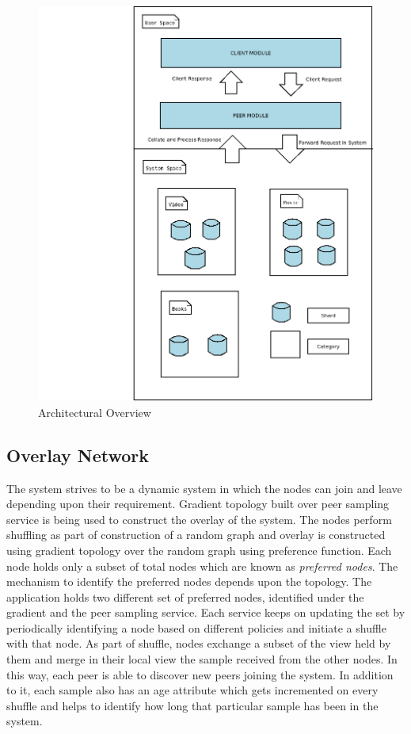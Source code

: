 \documentclass[12pt,a4paper,twoside,openright]{book}
\begin{document}
\begin{figure}[h]
	\includegraphics[scale=0.35]{OverallFunctioning}
	\centering
	\caption{Architectural Overview}
	\label{fig:overall_function}
\end{figure}



\subsection{Overlay Network}

The system strives to be a dynamic system in which the nodes can join and leave depending upon their requirement. Gradient topology built over peer sampling service is being used to construct the overlay of the system. The nodes perform shuffling as part of construction of a random graph and overlay is constructed using gradient topology over the random graph using preference function. Each node holds only a subset of total nodes which are known as \textit{preferred nodes}. The mechanism to identify the preferred nodes depends upon the topology. The application holds two different set of preferred nodes, identified under the gradient and the peer sampling service. Each service keeps on updating the set by periodically identifying a node based on different policies and initiate a shuffle with that node. As part of shuffle, nodes exchange a subset of the view held by them and merge in their local view the sample received from the other nodes. In this way, each peer is able to discover new peers joining the system. In addition to it, each sample also has an age attribute which gets incremented on every shuffle and helps to identify how long that particular sample has been in the system.
\end{document}
